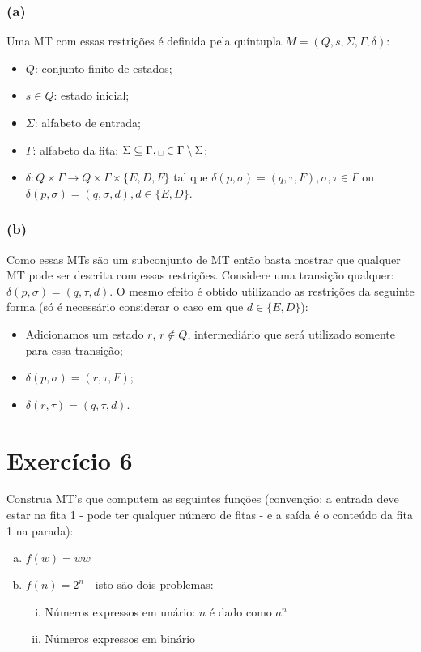 \documentclass{article}
\begin{document}
\subsubsection{(a)}

Uma MT com essas restrições é definida pela quíntupla $M=(Q,s,\Sigma,\Gamma,\delta)$:

\begin{itemize}
	\item $Q$: conjunto finito de estados;
	\item $s\in Q$: estado inicial;
	\item $\Sigma$: alfabeto de entrada;
	\item $\Gamma$: alfabeto da fita: $\Sigma\subseteq\Gamma,\text{\textvisiblespace}\in\Gamma\setminus\Sigma$;
	\item $\delta: Q\times\Gamma\rightarrow Q\times\Gamma\times\{E,D,F\}$ tal que $\delta(p,\sigma) = (q,\tau,F), \sigma,\tau\in\Gamma$ ou $\delta(p,\sigma) = (q,\sigma,d), d\in\{E,D\}$.
\end{itemize}

\subsubsection{(b)}

Como essas MTs são um subconjunto de MT então basta mostrar que qualquer MT pode ser descrita com essas restrições. Considere uma transição qualquer: $\delta(p,\sigma) = (q,\tau,d)$. O mesmo efeito é obtido utilizando as restrições da seguinte forma (só é necessário considerar o caso em que $d\in\{E,D\}$): 

\begin{itemize}
	\item Adicionamos um estado $r$, $r\not\in Q$, intermediário que será utilizado somente para essa transição;
	\item $\delta(p,\sigma) = (r,\tau,F)$;
	\item $\delta(r,\tau) = (q,\tau,d)$.
\end{itemize}

\section{Exercício 6}

Construa MT's que computem as seguintes funções (convenção: a entrada deve estar na fita 1 - pode ter qualquer número de fitas - e a saída é o conteúdo da fita 1 na parada):

\begin{enumerate}[(a)]
	\item $f(w) = ww$
	\item $f(n) = 2^n$ - isto são dois problemas:
	\begin{enumerate}[i.]
		\item Números expressos em unário: $n$ é dado como $a^n$
		\item Números expressos em binário
	\end{enumerate}
\end{enumerate}
\end{document}
